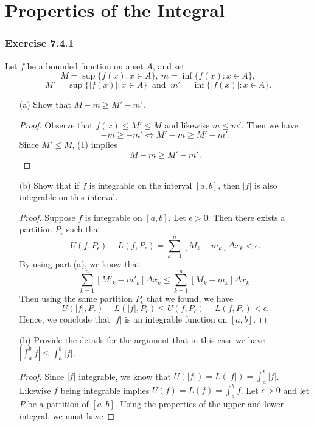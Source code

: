 
\section{Properties of the Integral}




\subsubsection{Exercise 7.4.1} Let \( f  \) be a bounded function on a set \( A  \), and set 
\[  M = \sup \{ f(x) : x \in A  \},  \ m = \inf \{ f(x) : x \in A \}, \]
\[  M' = \sup \{ | f(x)  | : x \in A  \} \ \text{ and } \ m' = \inf \{ | f(x)  | : x \in A \}. \]

\begin{enumerate}
    \item[(a)] Show that \( M - m \geq M' - m' \).
		\begin{proof}
		Observe that \( f(x) \leq M' \leq M \) and likewise \( m \leq m'  \). Then we have  
		\[  -m \geq -m' \iff M' - m \geq M' - m'. \tag{1}\]
		Since \( M' \leq M \), (1) implies 
		\[  M - m \geq M' - m'. \]
		\end{proof}
	\item[(b)] Show that if \( f  \) is integrable on the interval \( [a,b]  \), then \( | f |  \) is also integrable on this interval.
		\begin{proof}
			Suppose \( f \) is integrable on \( [a,b] \). Let \( \epsilon > 0  \). Then there exists a partition \(  P_{\epsilon } \) such that 
			\[  U(f,P_{\epsilon } ) - L(f, P_{\epsilon }) = \sum_{ k=1 }^{ n } [M_{k } - m_{k }] \Delta x_{k} < \epsilon. \]
			By using part (a), we know that 
			\[  \sum_{ k=1 }^{ n } [M'_{k } - m'_{k }] \Delta x_{k } \leq \sum_{ k=1 }^{ n } [ M_{k } - m_{k } ] \Delta x_{k }. \]
			Then using the same partition \( P_{\epsilon } \) that we found, we have 
			\[ U(| f | , P_{\epsilon } ) - L(| f | , P_{\epsilon } ) \leq U(f , P_{\epsilon }) - L( f  , P_{\epsilon }) < \epsilon. \] Hence, we conclude that \( | f |  \) is an integrable function on \( [a,b]  \). 
		\end{proof}
	\item[(b)] Provide the details for the argument that in this case we have \( | \int_{ a }^{ b } f  | \leq \int_{ a }^{ b } | f | \).
		\begin{proof}
			Since \( | f |  \) integrable, we know that \( U(| f | ) = L(| f | ) = \int_{ a }^{ b } | f |    \). Likewise \( f \) being integrable implies \( U( f ) = L(f) = \int_{ a }^{ b } f   \). Let \( \epsilon > 0 \) and let \( P \) be a partition of \( [a,b]  \). Using the properties of the upper and lower integral, we must have 

\end{proof}
\end{enumerate}
